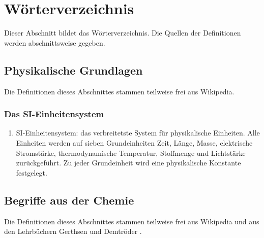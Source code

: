 \chapter{Wörterverzeichnis}

Dieser Abschnitt bildet das Wörterverzeichnis. Die Quellen der Definitionen werden abschnittsweise gegeben.

\section{Physikalische Grundlagen}
Die Definitionen dieses Abschnittes stammen teilweise frei aus Wikipedia.

\subsection{Das SI-Einheitensystem}
\begin{enumerate}
    \item   SI-Einheitensystem: das verbreitetste System für physikalische Einheiten. Alle Einheiten werden auf sieben Grundeinheiten Zeit, Länge, Masse, elektrische Stromstärke, thermodynamische Temperatur, Stoffmenge und Lichtstärke zurückgeführt. Zu jeder Grundeinheit wird eine physikalische Konstante festgelegt.
\end{enumerate}

\section{Begriffe aus der Chemie}
Die Definitionen dieses Abschnittes stammen teilweise frei aus Wikipedia und aus den Lehrbüchern Gerthsen \cite{gerthsen} und Demtröder \cite{demtröder2}.

